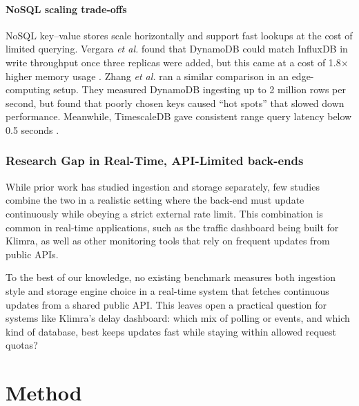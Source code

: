 \documentclass[nomenclature, english, biblatex]{kththesis}
\numberwithin{listing}{chapter}
\begin{document}
\subsubsection{NoSQL scaling trade-offs}
NoSQL key–value stores scale horizontally and support fast lookups at the cost of limited querying. 
Vergara \textit{et al.} found that DynamoDB could match InfluxDB in write throughput once three replicas were added, but this came at a cost of 1.8× higher memory usage \cite{Vergara2021PerformanceTSDB}. 
Zhang \textit{et al.} ran a similar comparison in an edge-computing setup. 
They measured DynamoDB ingesting up to 2 million rows per second, but found that poorly chosen keys caused “hot spots” that slowed down performance. 
Meanwhile, TimescaleDB gave consistent range query latency below 0.5 seconds \cite{Zhang2023EdgeTSDB}.



\subsection{Research Gap in Real-Time, API-Limited back-ends}
While prior work has studied ingestion and storage separately, few studies combine the two in a realistic setting where the back-end must update continuously while obeying a strict external rate limit.
This combination is common in real-time applications, such as the traffic dashboard being built for Klimra, as well as other monitoring tools that rely on frequent updates from public \glspl{API}.

To the best of our knowledge, no existing benchmark measures both ingestion style and storage engine choice in a real-time system that fetches continuous updates from a shared public API.
This leaves open a practical question for systems like Klimra's delay dashboard: which mix of polling or events, and which kind of database, best keeps updates fast while staying within allowed request quotas?





\cleardoublepage
\chapter{Method}
\label{ch:methods}
\end{document}
